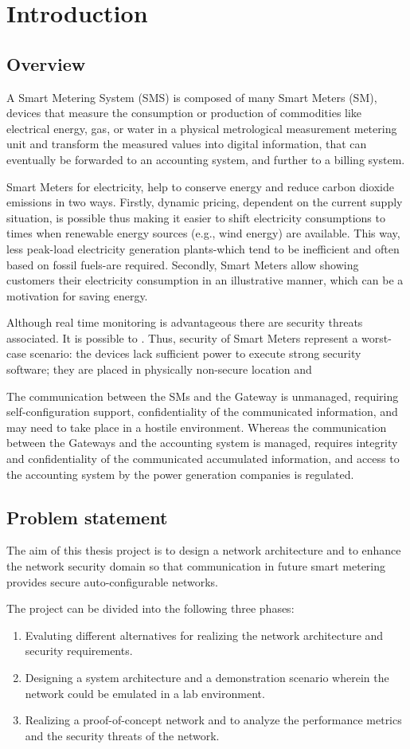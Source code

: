 \chapter{Introduction}
\section{Overview}
A Smart Metering System (SMS) is composed of many Smart Meters (SM), devices that measure the consumption or production of commodities like electrical energy, gas, or water in a physical metrological measurement metering unit and transform the measured values into digital information, that can eventually be forwarded to an accounting system, and further to a billing system. 

Smart Meters for electricity, help to conserve energy and reduce carbon dioxide emissions in two ways. Firstly, dynamic pricing, dependent on the current supply situation, is possible thus making it easier to shift electricity consumptions to times when renewable energy sources (e.g., wind energy) are available. This way, less peak-load electricity generation plants-which tend to be inefficient and often based on fossil fuels-are required. Secondly, Smart Meters allow showing customers their electricity consumption in an illustrative manner, which can be a motivation for saving energy.

Although real time monitoring is advantageous there are security threats associated. It is possible to .
Thus, security of Smart Meters represent a worst-case scenario: the devices lack sufficient power to execute strong security software; they are placed in physically non-secure location and  

The communication between the SMs and the Gateway is unmanaged, requiring self-configuration support, confidentiality of the communicated information, and may need to take place in a hostile environment. Whereas the communication between the Gateways and the accounting system is managed, requires integrity and confidentiality of the communicated accumulated information, and access to the accounting system by the power generation companies is regulated.

\section{Problem statement}
The aim of this thesis project is to design a network architecture and to enhance the network security domain so that communication in future smart metering provides secure auto-configurable networks.

The project can be divided into the following three phases:
\begin{enumerate}
\item Evaluting different alternatives for realizing the network architecture and security requirements.
\item Designing a system architecture and a demonstration scenario wherein the network could be emulated in a lab environment.
\item Realizing a proof-of-concept network and to analyze the performance metrics and the security threats of the network.
\end{enumerate}